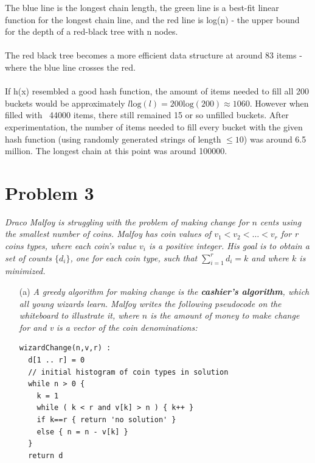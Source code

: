 \documentclass[12pt]{article} \setlength{\oddsidemargin}{0in}
\begin{document}
{\begin{enumerate}
  The blue line is the longest chain length, the green line is a best-fit linear function for the longest chain line, and the red line is log(n) - the upper bound for the depth of a red-black tree with n nodes.\\\\
  The red black tree becomes a more efficient data structure at around 83 items - where the blue line crosses the red. \\\\
  If h(x) resembled a good hash function, the amount of items needed to fill all 200 buckets would be approximately $l\text{log}(l) = 200\text{log}(200) \approx 1060$. However when filled with ~44000 items, there still remained 15 or so unfilled buckets. After experimentation, the number of items needed to fill every bucket with the given hash function (using randomly generated strings of length $\le 10$) was around 6.5 million. The longest chain at this point was around 100000. 

\end{enumerate}

\newpage

\section*{Problem 3}

\textit{Draco Malfoy is struggling with the problem of making change for $n$ cents
using the smallest number of coins. Malfoy has coin values of $v_1 < v_2 < \dots < v_r $ for r
coins types, where each coin's value $v_i$ is a positive integer. His goal is to obtain a set
of counts $\{ d_i \}$, one for each coin type, such that $\sum_{i=1}^r d_i=k$ and where $k$ is minimized.}

\begin{enumerate}
\item[(a)]{\textit{A greedy algorithm for making change is the \textbf{cashier's algorithm}, which all young wizards learn. Malfoy writes the following pseudocode on the whiteboard
to illustrate it, where $n$ is the amount of money to make change for and v is a
vector of the coin denominations:}
}

\begin{verbatim}
wizardChange(n,v,r) :
  d[1 .. r] = 0
  // initial histogram of coin types in solution
  while n > 0 {
    k = 1
    while ( k < r and v[k] > n ) { k++ }
    if k==r { return 'no solution' }
    else { n = n - v[k] }
  }
  return d
\end{verbatim}


\end{enumerate}}
\end{document}
